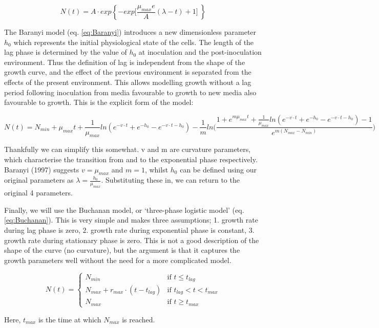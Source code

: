 \documentclass[a4paper]{article}
\begin{document}
\begin{equation}
 \label{eq:Gompertz}
N(t) = A \cdot exp \left\{-exp \Big[\frac{\mu_{max}e}{A} (\lambda - t) + 1 \Big]\  \right\}
\end{equation}

The Baranyi model (eq. \ref{eq:Baranyi}) introduces a new dimensionless parameter $h_{0}$ which represents the initial physiological state of the cells. The length of the lag phase is determined by the value of $h_{0}$ at inoculation and the post-inoculation environment. 
Thus the definition of lag is independent from the shape of the
growth curve, and the effect of the previous environment is separated from the
effects of the present environment. This allows modelling growth without a
lag period following inoculation from media favourable to growth to new media
also favourable to growth. This is the explicit form of the model:

\begin{equation}
 \label{eq:Baranyi}
N(t) = N_{min} + \mu_{max}t + \frac{1}{\mu_{max}} ln (e^{-v \cdot t} + e^{-h_{0}} - e^{-v \cdot t - h_{0}}) 
- \frac{1}{m} ln \bigg( \frac{1 + e^{m \mu_{max} t} + \frac{1}{\mu_{max}} ln (e^{-v \cdot t} + e^{-h_{0}} - e^{-v \cdot t - h_{0}}) - 1}{e^{m(N_{max}-N_{min})}} \bigg)
\end{equation}

Thankfully we can simplify this somewhat. v and m are curvature parameters, which characterise the transition from and to the exponential phase respectively. Baranyi (1997) suggests $v = \mu_{max}$ and $m = 1$, whilst $h_{0}$ can be defined using our original parameters as $\lambda = \frac{h_{0}}{\mu_{max}}$. Substituting these in, we can return to the original 4 parameters. \

Finally, we will use the Buchanan model, or `three-phase logistic model' (eq. \ref{eq:Buchanan}). This is very simple and makes three assumptions; 1. growth rate during lag phase is zero, 2. growth rate during exponential phase is constant, 3. growth rate during stationary phase is zero. This is not a good description of the shape of the curve (no curvature), but the argument is that it captures the growth parameters well without the need for a more complicated model.

\begin{equation}
 \label{eq:Buchanan}
N(t) =
\left\{
	\begin{array}{ll}
		N_{min}  & \mbox{if } t \leq t_{lag} \\
		N_{max} + r_{max} \cdot (t-t_{lag})  & \mbox{if } t_{lag} < t < t_{max} \\
		N_{max}  & \mbox{if } t \geq t_{max}
	\end{array}
\right.
\end{equation}

Here, $t_{max}$ is the time at which $N_{max}$ is reached.
\end{document}
